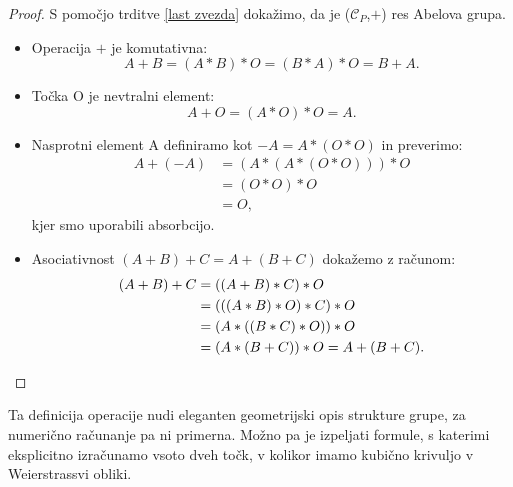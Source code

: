 \documentclass[12pt,a4paper,twoside]{article}
\theoremstyle{definition} %
\theoremstyle{plain} %
\numberwithin{equation}{section}  %
\begin{document}
\begin{proof}
S pomočjo trditve \ref{last zvezda} dokažimo, da je ($\mathcal{C}_P$,$+$) res Abelova grupa.

\begin{itemize}
\item Operacija $+$ je komutativna:
$$A+B = (A \ast B ) \ast O = (B \ast A) \ast O = B+A.$$
\item Točka O je nevtralni element:
$$A+O=(A \ast O) \ast O = A.$$
\item Nasprotni element A definiramo kot $-A = A \ast (O \ast O )$ in preverimo:
\begin{align}
A + (-A) &{} = (A \ast (A \ast (O \ast O))) \ast O \nonumber \\
&{} = (O \ast O) \ast O \nonumber \\
&{} = O, \nonumber
\end{align}
kjer smo uporabili absorbcijo.
\item Asociativnost $(A + B) + C = A + (B + C)$ dokažemo z računom:
\begin{align}
(A + B) + C &{} = ((A + B) \ast C) \ast O \nonumber \\
&{} = (((A \ast B) \ast O) \ast C) \ast O \nonumber \\
&{} = (A \ast ((B \ast C) \ast O)) \ast O \nonumber \\
&{} = (A \ast (B + C)) \ast O = A + (B + C). \nonumber \qedhere
\end{align}
\end{itemize}
\end{proof}

Ta definicija operacije nudi eleganten geometrijski opis strukture grupe, za numerično računanje pa ni primerna. Možno pa je izpeljati formule, s katerimi eksplicitno
izračunamo vsoto dveh točk, v kolikor imamo kubično krivuljo v Weierstrassvi obliki.
\end{document}
